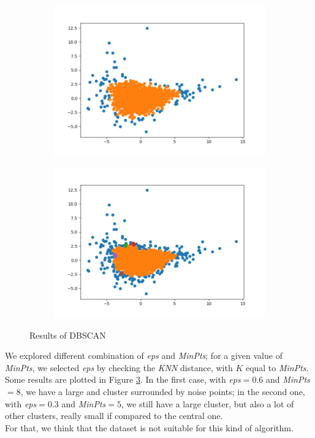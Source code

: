 \begin{figure}[h!]
	\captionsetup{justification=centering}
	\centering
	\begin{subfigure}{0.49\textwidth}
		\includegraphics[width=.65\textwidth]{img/clust_1/dbscan.png}
		\centering
		\label{fig:dbscan_good}
	\end{subfigure}
	\begin{subfigure}{0.49\textwidth}
		\includegraphics[width=.65\textwidth]{img/clust_1/dbscan_bad.png}
		\centering
		\label{fig:dbscan_bad}
	\end{subfigure}
	\caption{Results of DBSCAN}
	\label{fig:dbscan}
\end{figure}

We explored different combination of \emph{eps} and \emph{MinPts}; for a given value of \emph{MinPts}, we selected \emph{eps} by checking the \emph{KNN} distance, with $K$ equal to \emph{MinPts}.\\
Some results are plotted in Figure \ref{fig:dbscan}. In the first case, with \emph{eps}$= 0.6$ and \emph{MinPts}$=8$, we have a large and cluster surrounded by noise points; in the second one, with \emph{eps}$=0.3$ and \emph{MinPts}$=5$, we still have a large cluster, but also a lot of other clusters, really small if compared to the central one.\\
For that, we think that the dataset is not suitable for this kind of algorithm.
